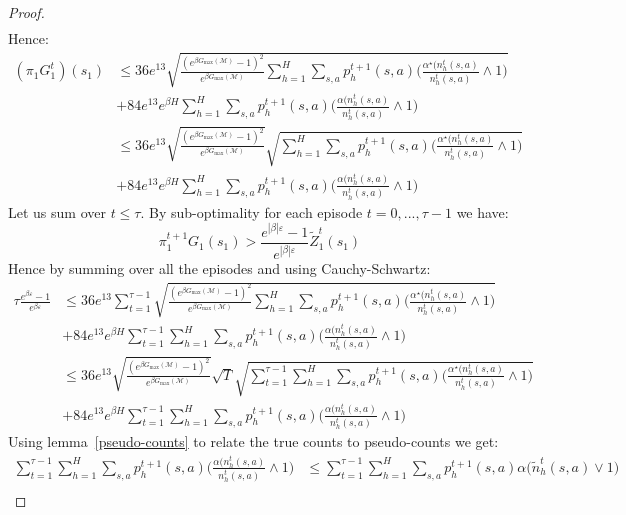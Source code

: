 \documentclass[final,12pt]{colt2026} %
\begin{document}
\begin{proof}
\begin{align*}
\end{align*}
Hence:
\begin{align*}
(\pi_1 G_1^t)(s_1)
&\leq 36 e^{13} \sqrt{\frac{(e^{\beta G_{\text{max}}(\mathcal{M})} - 1)^2}{e^{\beta G_{\text{max}}(\mathcal{M})}}\sum_{h=1}^H \sum_{s,a} p_h^{t+1}(s,a)\big(\frac{\alpha^\star\big(n_h^t(s,a)}{n_h^t(s,a)} \wedge 1 \big)} \\&+ 84 e^{13} e^{\beta H}\sum_{h=1}^H \sum_{s,a} p_h^{t+1}(s,a)\big(\frac{\alpha\big(n_h^t(s,a)}{n_h^t(s,a)} \wedge 1 \big) \\
&\leq 36 e^{13} \sqrt{\frac{(e^{\beta G_{\text{max}}(\mathcal{M})} - 1)^2}{e^{\beta G_{\text{max}}(\mathcal{M})}}}\sqrt{\sum_{h=1}^H \sum_{s,a} p_h^{t+1}(s,a)\big(\frac{\alpha^\star\big(n_h^t(s,a)}{n_h^t(s,a)} \wedge 1 \big)}\\& + 84 e^{13} e^{\beta H}\sum_{h=1}^H \sum_{s,a} p_h^{t+1}(s,a)\big(\frac{\alpha\big(n_h^t(s,a)}{n_h^t(s,a)} \wedge 1 \big)
\end{align*}
Let us sum over $t \leq \tau$. By sub-optimality for each episode $t = 0,...,\tau-1$ we have:
$$\pi_1^{t+1} G_1(s_1) > \frac{e^{|\beta| \varepsilon} - 1}{e^{|\beta| \varepsilon}} \widetilde{Z}^t_1(s_1)$$
Hence by summing over all the episodes and using Cauchy-Schwartz:
\begin{align*}
    \tau \frac{e^{\beta \varepsilon} - 1}{e^{\beta \varepsilon}}  &\leq 36 e^{13} \sum_{t=1}^{\tau - 1} \sqrt{\frac{(e^{\beta G_{\text{max}}(\mathcal{M})} - 1)^2}{e^{\beta G_{\text{max}}(\mathcal{M})}}\sum_{h=1}^H \sum_{s,a} p_h^{t+1}(s,a)\big(\frac{\alpha^\star\big(n_h^t(s,a)}{n_h^t(s,a)} \wedge 1 \big)} \\&+ 84 e^{13} e^{\beta H}\sum_{t=1}^{\tau -1}\sum_{h=1}^H \sum_{s,a} p_h^{t+1}(s,a)\big(\frac{\alpha\big(n_h^t(s,a)}{n_h^t(s,a)} \wedge 1 \big)\\
    &\leq 36 e^{13} \sqrt{\frac{(e^{\beta G_{\text{max}}(\mathcal{M})} - 1)^2}{e^{\beta G_{\text{max}}(\mathcal{M})}}}\sqrt{T}\sqrt{\sum_{t=1}^{\tau - 1}\sum_{h=1}^H \sum_{s,a} p_h^{t+1}(s,a)\big(\frac{\alpha^\star\big(n_h^t(s,a)}{n_h^t(s,a)} \wedge 1 \big)} \\&+ 84 e^{13} e^{\beta H}\sum_{t=1}^{\tau -1}\sum_{h=1}^H \sum_{s,a} p_h^{t+1}(s,a)\big(\frac{\alpha\big(n_h^t(s,a)}{n_h^t(s,a)} \wedge 1 \big)
\end{align*}
Using lemma~\ref{pseudo-counts} to relate the true counts to pseudo-counts we get:
\begin{align*}
    \sum_{t=1}^{\tau -1}\sum_{h=1}^H \sum_{s,a} p_h^{t+1}(s,a)\big(\frac{\alpha\big(n_h^t(s,a)}{n_h^t(s,a)} \wedge 1 \big) &\leq \sum_{t=1}^{\tau -1}\sum_{h=1}^H \sum_{s,a} p_h^{t+1}(s,a)\alpha\big(\widetilde{n}_h^t(s,a) \vee 1\big) \\

\end{align*}
\end{proof}
\end{document}
